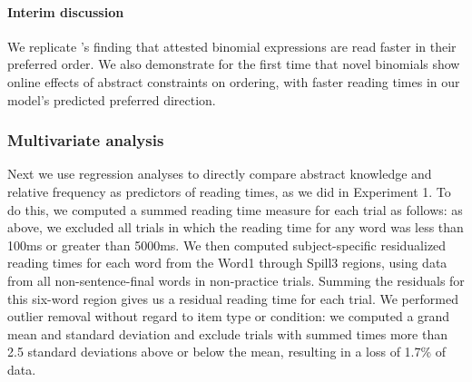 \documentclass[authoryear]{elsarticle}
\begin{document}
\paragraph{Interim discussion}
We replicate \citeauthor{SiyanovaChanturia:2011ep}'s \citeyearpar{SiyanovaChanturia:2011ep} finding that attested binomial expressions are read faster in their preferred order. We also demonstrate for the first time that novel binomials show online effects of abstract constraints on ordering, with faster reading times in our model's predicted preferred direction.

%



\subsubsection{Multivariate analysis}
Next we use regression analyses to directly compare abstract knowledge and relative frequency as predictors of reading times, as we did in Experiment 1. To do this, we computed a summed reading time measure for each trial as follows: as above, we excluded all trials in which the reading time for any word was less than 100ms or greater than 5000ms. We then computed subject-specific residualized reading times for each word from the Word1 through Spill3 regions, using data from all non-sentence-final words in non-practice trials. Summing the residuals for this six-word region gives us a residual reading time for each trial. We performed outlier removal without regard to item type or condition: we computed a grand mean and standard deviation and exclude trials with summed times more than 2.5 standard deviations above or below the mean, resulting in a loss of 1.7\% of data.
\end{document}
